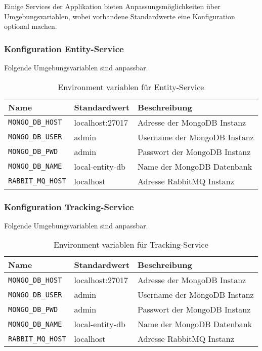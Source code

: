 Einige Services der Applikation bieten Anpassungsmöglichkeiten über Umgebungsvariablen, wobei vorhandene Standardwerte eine Konfiguration optional machen.

\subsubsection{Konfiguration Entity-Service}

Folgende Umgebungsvariablen sind anpassbar.

\begin{table}[h]
	\begin{tabular}{|l|l|l|}
		\hline
		Name & Standardwert & Beschreibung \\ \hline
		\verb|MONGO_DB_HOST| & localhost:27017 & Adresse der MongoDB Instanz \\ \hline
		\verb|MONGO_DB_USER| & admin & Username der MongoDB Instanz \\ \hline
		\verb|MONGO_DB_PWD| & admin & Passwort der MongoDB Instanz \\ \hline
		\verb|MONGO_DB_NAME| & local-entity-db & Name der MongoDB Datenbank \\ \hline
		\verb|RABBIT_MQ_HOST| & localhost & Adresse RabbitMQ Instanz \\ \hline
	\end{tabular}
	\caption{Environment variablen für Entity-Service }
\end{table}

\subsubsection{Konfiguration Tracking-Service}

Folgende Umgebungsvariablen sind anpassbar.

\begin{table}[h]
	\begin{tabular}{|l|l|l|}
		\hline
		Name & Standardwert & Beschreibung \\ \hline
		\verb|MONGO_DB_HOST| & localhost:27017 & Adresse der MongoDB Instanz \\ \hline
		\verb|MONGO_DB_USER| & admin & Username der MongoDB Instanz \\ \hline
		\verb|MONGO_DB_PWD| & admin & Passwort der MongoDB Instanz \\ \hline
		\verb|MONGO_DB_NAME| & local-entity-db & Name der MongoDB Datenbank \\ \hline
		\verb|RABBIT_MQ_HOST| & localhost & Adresse RabbitMQ Instanz \\ \hline
	\end{tabular}
	\caption{Environment variablen für Tracking-Service }
\end{table}

